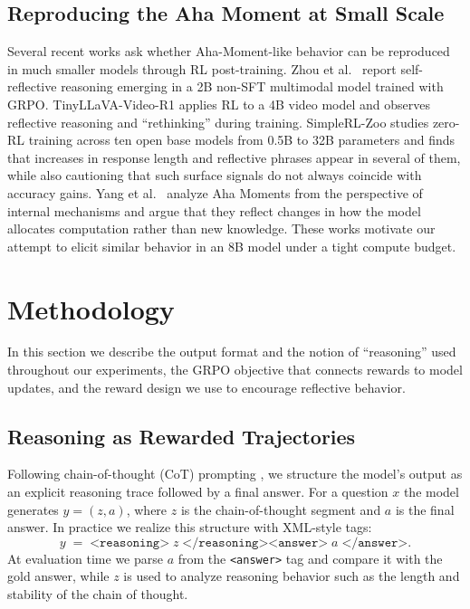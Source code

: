 \documentclass{article}
\begin{document}
\subsection{Reproducing the Aha Moment at Small Scale}

Several recent works ask whether Aha-Moment-like behavior can be reproduced in much smaller models through RL post-training. Zhou et al.\ \cite{r1zero2025} report self-reflective reasoning emerging in a 2B non-SFT multimodal model trained with GRPO. TinyLLaVA-Video-R1 \cite{tinyllava2025} applies RL to a 4B video model and observes reflective reasoning and ``rethinking'' during training. SimpleRL-Zoo \cite{simplerlzoo} studies zero-RL training across ten open base models from 0.5B to 32B parameters and finds that increases in response length and reflective phrases appear in several of them, while also cautioning that such surface signals do not always coincide with accuracy gains. Yang et al.\ \cite{yang2025aha} analyze Aha Moments from the perspective of internal mechanisms and argue that they reflect changes in how the model allocates computation rather than new knowledge. These works motivate our attempt to elicit similar behavior in an 8B model under a tight compute budget.

\section{Methodology}

In this section we describe the output format and the notion of ``reasoning'' used throughout our experiments, the GRPO objective that connects rewards to model updates, and the reward design we use to encourage reflective behavior.

\subsection{Reasoning as Rewarded Trajectories}

Following chain-of-thought (CoT) prompting \cite{wei2022cot, kojima2022zeroshot}, we structure the model's output as an explicit reasoning trace followed by a final answer. For a question $x$ the model generates $y = (z, a)$, where $z$ is the chain-of-thought segment and $a$ is the final answer. In practice we realize this structure with XML-style tags:
\begin{equation}
    y \;=\; \texttt{<reasoning>}\; z \;\texttt{</reasoning><answer>}\; a \;\texttt{</answer>}.
\end{equation}
At evaluation time we parse $a$ from the \texttt{<answer>} tag and compare it with the gold answer, while $z$ is used to analyze reasoning behavior such as the length and stability of the chain of thought.
\end{document}
